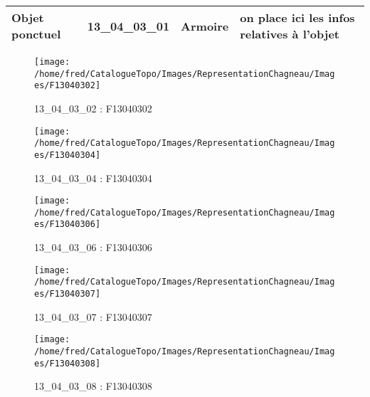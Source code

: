 \documentclass[12pt,titlepage,oneside]{book}
\begin{document}
\renewcommand{\arraystretch}{1.2}
\begin{supertabular}{|p{10cm}|c|p{13cm}|p{12cm}|}
 Objet ponctuel & 13\_04\_03\_01 & Armoire & on place ici les infos relatives à l'objet\\
\hline
\end{supertabular}
\begin{figure}[h!]
  \hfill         %
  \begin{minipage}[t]{3cm}
    \begin{center}
      \texttt{[image: /home/fred/CatalogueTopo/Images/RepresentationChagneau/Images/F13040302]}
      \caption[F13040302]{\label{} 13\_04\_03\_02 : F13040302}
    \end{center}
  \end{minipage}
  \begin{minipage}[t]{3cm}
    \begin{center}
      \texttt{[image: /home/fred/CatalogueTopo/Images/RepresentationChagneau/Images/F13040304]}
      \caption[F13040304]{\label{} 13\_04\_03\_04 : F13040304}
    \end{center}
  \end{minipage}
  \begin{minipage}[t]{3cm}
    \begin{center}
      \texttt{[image: /home/fred/CatalogueTopo/Images/RepresentationChagneau/Images/F13040306]}
      \caption[F13040306]{\label{} 13\_04\_03\_06 : F13040306}
    \end{center}
  \end{minipage}
  \begin{minipage}[t]{3cm}
    \begin{center}
      \texttt{[image: /home/fred/CatalogueTopo/Images/RepresentationChagneau/Images/F13040307]}
      \caption[F13040307]{\label{} 13\_04\_03\_07 : F13040307}
    \end{center}
  \end{minipage}
  \begin{minipage}[t]{3cm}
    \begin{center}
      \texttt{[image: /home/fred/CatalogueTopo/Images/RepresentationChagneau/Images/F13040308]}
      \caption[F13040308]{\label{} 13\_04\_03\_08 : F13040308}
    \end{center}
  \end{minipage}
\end{figure}
\end{document}
